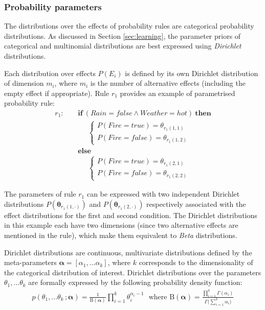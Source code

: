 \subsubsection*{Probability parameters}

The distributions over the effects of probability rules are categorical probability distributions.  As discussed in Section \ref{sec:learning}, the parameter priors of categorical and multinomial distributions are best expressed using \textit{Dirichlet} distributions. 

Each distribution over effects $P(E_i)$ is defined by its own Dirichlet distribution of dimension $m_i$, where $m_i$ is the number of alternative effects (including the empty effect if appropriate).  Rule $r_{1}$ provides an example of parametrised probability rule: 
\begin{align*}
r_{1}: \ \ \ \ \ & \textbf{if} \ (\mathit{Rain}\!=\!\mathit{false} \land \mathit{Weather}\!=\!\mathit{hot}) \ \textbf{then} \\
& \;\;\;\;\;  \begin{cases}
 P(\mathit{Fire}\!=\!\mathit{true}) = \theta_{r_{1}(1,1)} \\ 
P(\mathit{Fire}\!=\!\mathit{false}) = \theta_{r_{1}(1,2)}
\end{cases} \\ 
& \textbf{else} \\
& \;\;\;\;\; \begin{cases}
P(\mathit{Fire}\!=\!\mathit{true}) = \theta_{r_{1}(2,1)} \\
P(\mathit{Fire}\!=\!\mathit{false}) = \theta_{r_{1}(2,2)}
\end{cases} 
\end{align*}


The parameters of rule $r_{1}$ can be expressed with two independent Dirichlet distributions $P(\boldsymbol\theta_{r_{1}(1,\cdot)})$ and $P(\boldsymbol\theta_{r_{1}(2,\cdot)})$ respectively associated with the effect distributions for the first and second condition.  The Dirichlet distributions in this example each have two dimensions (since two alternative effects are mentioned in the rule), which make them equivalent to \textit{Beta} distributions. 

Dirichlet distributions are continuous, multivariate distributions defined by the meta-parameters $\boldsymbol\alpha = [\alpha_1,... \alpha_k]$, where $k$ corresponds to the dimensionality of the categorical distribution of interest.  Dirichlet distributions over the parameters $\theta_1,... \theta_k$ are formally expressed by the following probability density function:
\begin{align}
p(\theta_1,...\theta_k\,; \boldsymbol\alpha) = \frac{1}{\mathrm{B}(\boldsymbol\alpha)} \prod_{i=1}^k \theta_i^{\alpha_i - 1} \ \ \ \text{where } \mathrm{B}(\boldsymbol\alpha) = \frac{\prod_{i=1}^k \Gamma(\alpha_i)}{\Gamma\bigl(\sum_{i=1}^k \alpha_i\bigr)}
\end{align}

